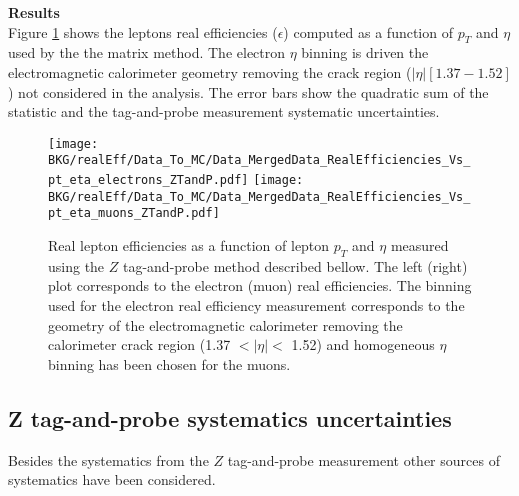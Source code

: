 	
\par{\bf Results\\}
	Figure \ref{fig:Real_Eff_Data_Vs_pt_eta} shows the leptons real efficiencies ($\epsilon$) computed as a function of $p_{T}$ and $\eta$ used by the the matrix method. The electron $\eta$ binning is driven the electromagnetic calorimeter geometry removing the crack region ($|\eta|[1.37-1.52]$) not considered in the analysis. The error bars show the quadratic sum of the statistic and the tag-and-probe measurement systematic uncertainties. 
				
\begin{figure}[!htb]
  \begin{center} 
   \texttt{[image: BKG/realEff/Data\_To\_MC/Data\_MergedData\_RealEfficiencies\_Vs\_pt\_eta\_electrons\_ZTandP.pdf]} 
   \texttt{[image: BKG/realEff/Data\_To\_MC/Data\_MergedData\_RealEfficiencies\_Vs\_pt\_eta\_muons\_ZTandP.pdf]} 
   \caption{\label{fig:Real_Eff_Data_Vs_pt_eta} Real lepton efficiencies as a function of lepton $p_{T}$ and $\eta$ measured using the $Z$ tag-and-probe method described bellow. The left (right) plot corresponds to the electron (muon) real efficiencies. The binning used for the electron real efficiency measurement corresponds to the geometry of the electromagnetic calorimeter removing the calorimeter crack region (1.37 $< |\eta| <$ 1.52) and homogeneous $\eta$ binning has been chosen for the muons.}
  \end{center}
\end{figure}



	\subsection{Z tag-and-probe systematics uncertainties}
	\label{App:RealEff_Z_Syst}
        Besides the systematics from the $Z$ tag-and-probe measurement other sources of systematics have been considered.
	
